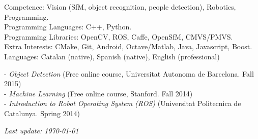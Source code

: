 \documentclass{article}
\begin{document}
\begin{llist}
\label{Skills}
Competence: Vision (SfM, object recognition, people detection), Robotics, Programming.\\
Programming Languages: C++, Python.\\
Programming Libraries: OpenCV, ROS, Caffe, OpenSfM, CMVS/PMVS. \\
Extra Interests: CMake, Git, Android, Octave/Matlab, Java, Javascript, Boost. \\
Languages: Catalan (native), Spanish (native), English  (professional)


%


%

%


\label{Relevant Coursework}
- \textit{Object Detection} (Free online course, Universitat Autonoma de Barcelona. Fall 2015)\\
- \textit{Machine Learning} (Free online course, Stanford. Fall 2014)\\
- \textit{Introduction to Robot Operating System (ROS)} (Universitat Politecnica de Catalunya. Spring 2014)

\label{Reference}


\end{llist}

{\em Last update: \today}
\end{document}
